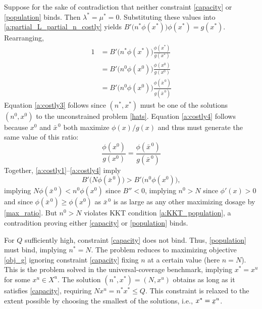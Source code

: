 \documentclass[12pt]{article}
\newcommand{\lowerbar}[1]{\underaccent{\bar}{#1}}
\newcommand{\efficacy}{\phi}
\newcommand{\general}{g}
\newcommand{\benefit}{B}
\newcommand{\xuniv}{x^{u}}
\newcommand{\Xuniv}{X^{u}}
\newcommand{\xunivlbar}{\lowerbar{x}^{u}}
\newcommand{\xno}{x^{0}}
\newcommand{\xnobar}{\bar{x}^{\,0}}
\newcommand{\nno}{n^{0}}
\begin{document}
Suppose for the sake of contradiction that neither constraint
\eqref{capacity} or \eqref{population} binds. Then $\lambda^* = \mu^*
= 0$. Substituting these values into
\eqref{a:partial_L_partial_n_costly} yields $\benefit' \! \bigl( n^*
\efficacy(x^*) \bigr) \efficacy(x^*) = \general(x^*)$. Rearranging,
\begin{align}
1 & = \benefit' \! \bigl( n^* \efficacy(x^*) \bigr) \frac{\efficacy(x^*)}{\general(x^*)} \label{a:costly2} \\
& = \benefit' \! \bigl( \nno \efficacy(\xno) \bigr) \frac{\efficacy(\xno)}{\general(\xno)} \label{a:costly3} \\
& = \benefit' \! \bigl( \nno \efficacy(\xno) \bigr) \frac{\efficacy(\xnobar)}{\general(\xnobar)} \label{a:costly4} 
\end{align} 
Equation \eqref{a:costly3} follows since $(n^*, x^*)$ must be one of
the solutions $(\nno, \xno)$ to the unconstrained problem
\eqref{hats}. Equation \eqref{a:costly4} follows because $\xno$ and
$\xnobar$ both maximize $\efficacy(x) / \general(x)$ and thus must
generate the same value of this ratio:
\begin{equation}
\label{a:same_ratio}
\frac{\efficacy(\xno)}{\general(\xno)} = \frac{\efficacy(\xnobar)}{\general(\xnobar)}
\end{equation}
Together,
\eqref{a:costly1}--\eqref{a:costly4} imply 
\begin{equation}
\label{a:use_for_peaked_proof}
\benefit' \! \bigl( N \efficacy(\xnobar) \bigr) > \benefit' \! \bigl( \nno \efficacy(\xno)
\bigr),
\end{equation}
implying $N \efficacy(\xnobar) < \nno \efficacy(\xno)$ since
$\benefit'' < 0$, implying $\nno> N$ since $\efficacy'(x) > 0$ and
since $\efficacy(\xnobar) \geq \efficacy(\xno)$ as $\xnobar$ is as
large as any other maximizing dosage by \eqref{max_ratio}. But $\nno >
N$ violates KKT condition \eqref{a:KKT_population}, a contradition
proving either \eqref{capacity} or \eqref{population} binds.

For $Q$ sufficiently high, constraint \eqref{capacity} does not
bind. Thus, \eqref{population} must bind, implying $n^* = N$. The
problem reduces to maximizing objective \eqref{obj_g} ignoring
constraint \eqref{capacity} fixing $n$ at a certain value (here $n =
N$). This is the problem solved in the universal-coverage benchmark,
implying $x^* = \xuniv$ for some $\xuniv \in \Xuniv$. The solution
$(n^*, x^*) = (N, \xuniv)$ obtains as long as it satisfies
\eqref{capacity}, requiring $N \xuniv = n^* x^* \leq Q$. This
constraint is relaxed to the extent possible by choosing the smallest
of the solutions, i.e., $x^* = \xunivlbar$.
\end{document}
